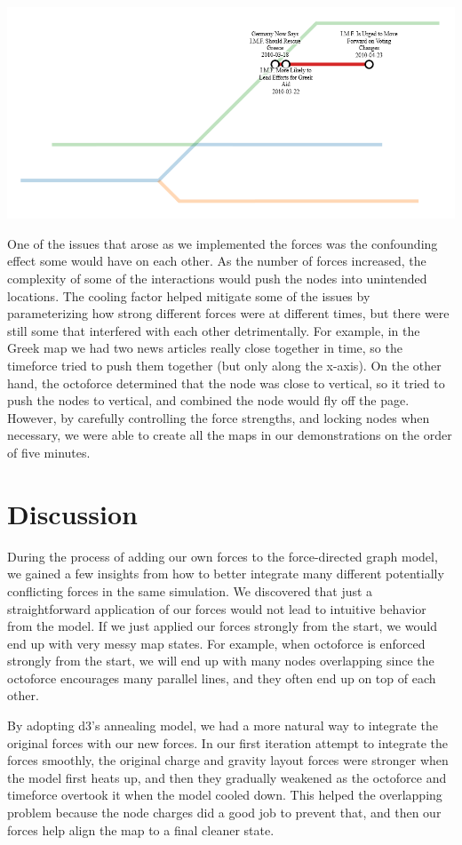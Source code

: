 \documentclass{chi2009}
\begin{document}
\includegraphics[width=\columnwidth]{Metro4.png}

One of the issues that arose as we implemented the forces was the confounding effect some would have on each other.  As the number of forces increased, the complexity of some of the interactions would push the nodes into unintended locations.  The cooling factor helped mitigate some of the issues by parameterizing how strong different forces were at different times, but there were still some that interfered with each other detrimentally.  For example, in the Greek map we had two news articles really close together in time, so the timeforce tried to push them together (but only along the x-axis).  On the other hand, the octoforce determined that the node was close to vertical, so it tried to push the nodes to vertical, and combined the node would fly off the page.  However, by carefully controlling the force strengths, and locking nodes when necessary, we were able to create all the maps in our demonstrations on the order of five minutes.  

\section{Discussion}

During the process of adding our own forces to the force-directed graph model, we gained a few insights from how to better integrate many different potentially conflicting forces in the same simulation.  We discovered that just a straightforward application of our forces would not lead to intuitive behavior from the model.  If we just applied our forces strongly from the start, we would end up with very messy map states.  For example, when octoforce is enforced strongly from the start, we will end up with many nodes overlapping since the octoforce encourages many parallel lines, and they often end up on top of each other.  

By adopting d3’s annealing model, we had a more natural way to integrate the original forces with our new forces.  In our first iteration attempt to integrate the forces smoothly, the original charge and gravity layout forces were stronger when the model first heats up, and then they gradually weakened as the octoforce and timeforce overtook it when the model cooled down.  This helped the overlapping problem because the node charges did a good job to prevent that, and then our forces help align the map to a final cleaner state.  
\end{document}
